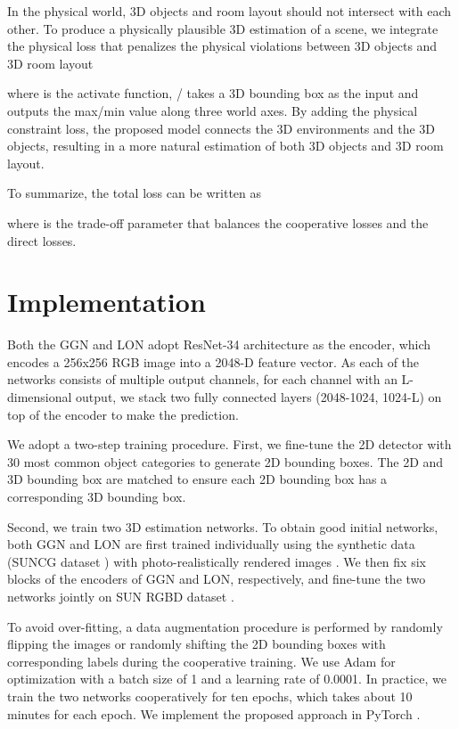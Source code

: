 \documentclass{article}
\begin{document}
In the physical world, 3D objects and room layout should not intersect with each other. To produce a physically plausible 3D estimation of a scene, we integrate the physical loss that penalizes the physical violations between 3D objects and 3D room layout

where  is the activate function,  /  takes a 3D bounding box as the input and outputs the max/min value along three world axes. By adding the physical constraint loss, the proposed model connects the 3D environments and the 3D objects, resulting in a more natural estimation of both 3D objects and 3D room layout.

To summarize, the total loss can be written as

where  is the trade-off parameter that balances the cooperative losses and the direct losses.

\setlength\abovecaptionskip{0pt}
\setlength\belowcaptionskip{0pt}

\section{Implementation}

Both the GGN and LON adopt ResNet-34 \citep{he2016deep} architecture as the encoder, which encodes a 256x256 RGB image into a 2048-D feature vector. As each of the networks consists of multiple output channels, for each channel with an L-dimensional output, we stack two fully connected layers (2048-1024, 1024-L) on top of the encoder to make the prediction.

We adopt a two-step training procedure. First, we fine-tune the 2D detector \citep{dai2017deformable,bodla2017softnms} with 30 most common object categories to generate 2D bounding boxes. The 2D and 3D bounding box are matched to ensure each 2D bounding box has a corresponding 3D bounding box.

Second, we train two 3D estimation networks. To obtain good initial networks, both GGN and LON are first trained individually using the synthetic data (SUNCG dataset \citep{song2017semantic}) with photo-realistically rendered images \cite{zhang2017physically}. We then fix six blocks of the encoders of GGN and LON, respectively, and fine-tune the two networks jointly on SUN RGBD dataset \citep{song2015sun}.

To avoid over-fitting, a data augmentation procedure is performed by randomly flipping the images or randomly shifting the 2D bounding boxes with corresponding labels during the cooperative training. We use Adam \citep{kingma2014adam} for optimization with a batch size of 1 and a learning rate of 0.0001. In practice, we train the two networks cooperatively for ten epochs, which takes about 10 minutes for each epoch. We implement the proposed approach in PyTorch \citep{paszke2017automatic}.
\end{document}
